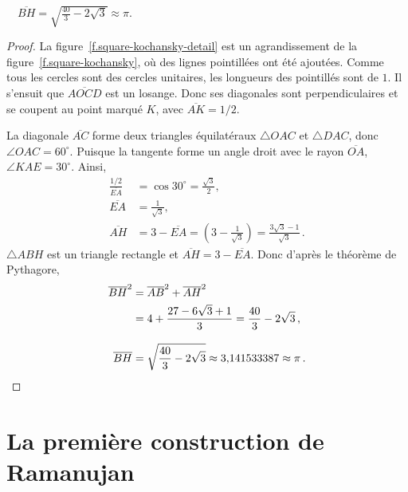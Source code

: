 \begin{theorem}
$\quad\overline{BH}=\sqrt{\displaystyle\frac{40}{3}-2\sqrt{3}}\approx \pi$.
\end{theorem}
\begin{proof}
La figure~\ref{f.square-kochansky-detail} est un agrandissement de la figure~\ref{f.square-kochansky}, où des lignes pointillées ont été ajoutées. Comme tous les cercles sont des cercles unitaires, les longueurs des pointillés sont de $1$. Il s'ensuit que $\overline{AOCD}$ est un losange. Donc ses diagonales sont perpendiculaires et se coupent au point marqué $K$, avec  $\overline{AK}=1/2$.



La diagonale $\overline{AC}$ forme deux triangles équilatéraux $\triangle OAC$ et $\triangle DAC$, donc $\angle OAC=60^\circ$. Puisque la tangente forme un angle droit avec le rayon $\overline{OA}$, $\angle KAE=30^\circ$. Ainsi,
\begin{align*}
\frac{1/2}{\overline{EA}}&=
\cos 30^\circ=\displaystyle\frac{\sqrt{3}}{2},\\
\overline{EA}&=\displaystyle\frac{1}{\sqrt{3}},\\
\overline{AH}&=3-\overline{EA}=\left(3-\displaystyle\frac{1}{\sqrt{3}}\right)
=\displaystyle\frac{3\sqrt{3}-1}{\sqrt{3}}\,.
\end{align*}
$\triangle ABH$ est un triangle rectangle et $\overline{AH}=3-\overline{EA}$. Donc d'après le théorème de Pythagore,
\begin{align*}
\overline{BH}^2&=\overline{AB}^2+\overline{AH}^2\\
&=4+\displaystyle\frac{27 -6\sqrt{3}+1}{3}=\frac{40}{3}-2\sqrt{3}\,,\\
\overline{BH}&=\rule{0pt}{25pt}\sqrt{\displaystyle\frac{40}{3}-2\sqrt{3}}\approx \mbox{3,141533387}\approx \pi\,.\qedhere
\end{align*}
\end{proof}


\section{La première construction de Ramanujan}\label{s.square-ramanujan-first}



